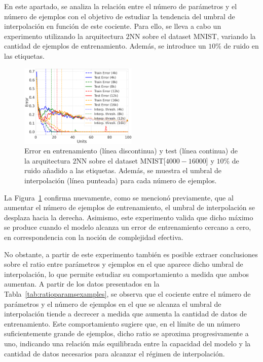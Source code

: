 En este apartado, se analiza la relación entre el número de parámetros y el número de ejemplos con el objetivo de estudiar la tendencia del umbral de interpolación en función de este cociente. Para ello, se lleva a cabo un experimento utilizando la arquitectura $2$NN sobre el dataset MNIST, variando la cantidad de ejemplos de entrenamiento. Además, se introduce un $10\%$ de ruido en las etiquetas.

\begin{figure}[h]
    \centering
    \includegraphics[width=0.5\textwidth]{img/experiments/ratioparamsexamples.png}
    \caption[Ratio parámetros frente a número de ejemplos en el doble descenso.]{Error en entrenamiento (línea discontinua) y test (línea continua) de la arquitectura $2$NN sobre el dataset MNIST[$4000-16000$] y $10$\% de ruido añadido a las etiquetas. Además, se muestra el umbral de interpolación (línea punteada) para cada número de ejemplos.}\label{fig:ratioparamsexamples}
\end{figure}

La Figura~\ref{fig:ratioparamsexamples} confirma nuevamente, como se mencionó previamente, que al aumentar el número de ejemplos de entrenamiento, el umbral de interpolación se desplaza hacia la derecha. Asimismo, este experimento valida que dicho máximo se produce cuando el modelo alcanza un error de entrenamiento cercano a cero, en correspondencia con la noción de complejidad efectiva.

No obstante, a partir de este experimento también es posible extraer conclusiones sobre el ratio entre parámetros y ejemplos en el que aparece dicho umbral de interpolación, lo que permite estudiar su comportamiento a medida que ambos aumentan. A partir de los datos presentados en la Tabla~\ref{tab:ratioparamsexamples}, se observa que el cociente entre el número de parámetros y el número de ejemplos en el que se alcanza el umbral de interpolación tiende a decrecer a medida que aumenta la cantidad de datos de entrenamiento. Este comportamiento sugiere que, en el límite de un número suficientemente grande de ejemplos, dicho ratio se aproxima progresivamente a uno, indicando una relación más equilibrada entre la capacidad del modelo y la cantidad de datos necesarios para alcanzar el régimen de interpolación. 

